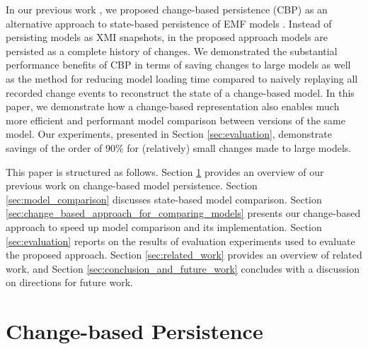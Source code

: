 \documentclass{jot}
\begin{document}
    In our previous work \cite{DBLP:conf/models/YohannisKP17,yohannis2018towards,DBLP:conf/models/YohannisRPK18}, we proposed change-based persistence (CBP) as an alternative approach to state-based persistence of EMF models \cite{steinberg2008emf}. Instead of persisting models as XMI snapshots, in the proposed approach models are persisted as a complete history of changes. We demonstrated the substantial performance benefits of CBP in terms of saving changes to large models \cite{DBLP:conf/models/YohannisKP17} as well as the method for reducing model loading time compared to naively replaying all recorded change events \cite{DBLP:conf/models/YohannisRPK18} to reconstruct the state of a change-based model. 
    In this paper, we demonstrate how a change-based representation also enables much more efficient and performant model comparison between versions of the same model. Our experiments, presented in Section \ref{sec:evaluation}, demonstrate savings of the order of 90\% for (relatively) small changes made to large models.
    
    This paper is structured as follows. 
    Section \ref{sec:change-based_persistence} provides an overview of our previous work on change-based model persistence. 
    Section \ref{sec:model_comparison} discusses state-based model comparison. Section \ref{sec:change_based_approach_for_comparing_models} presents our change-based approach to speed up model comparison and its implementation. 
    Section \ref{sec:evaluation} reports on the results of evaluation experiments used to evaluate the proposed approach. 
    Section \ref{sec:related_work} provides an overview of related work, and
    Section \ref{sec:conclusion_and_future_work} concludes with a discussion on directions for future work.
    
    \vspace{-10pt}
    \section{Change-based Persistence}
    \label{sec:change-based_persistence}
    
\end{document}
